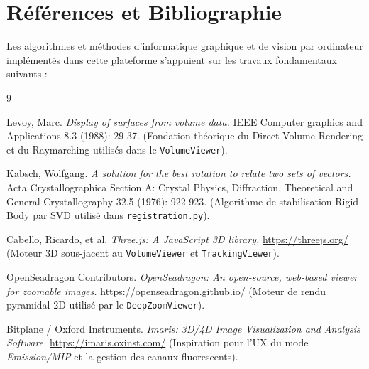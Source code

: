 \chapter{Références et Bibliographie}
\label{chap:references}

Les algorithmes et méthodes d'informatique graphique et de vision par ordinateur implémentés dans cette plateforme s'appuient sur les travaux fondamentaux suivants :

\begin{thebibliography}{9}

Levoy, Marc. 
\textit{Display of surfaces from volume data.}
IEEE Computer graphics and Applications 8.3 (1988): 29-37.
\newblock (Fondation théorique du Direct Volume Rendering et du Raymarching utilisés dans le \texttt{VolumeViewer}).

Kabsch, Wolfgang. 
\textit{A solution for the best rotation to relate two sets of vectors.}
Acta Crystallographica Section A: Crystal Physics, Diffraction, Theoretical and General Crystallography 32.5 (1976): 922-923.
\newblock (Algorithme de stabilisation Rigid-Body par SVD utilisé dans \texttt{registration.py}).

Cabello, Ricardo, et al.
\textit{Three.js: A JavaScript 3D library.}
\newblock \url{https://threejs.org/} (Moteur 3D sous-jacent au \texttt{VolumeViewer} et \texttt{TrackingViewer}).

OpenSeadragon Contributors.
\textit{OpenSeadragon: An open-source, web-based viewer for zoomable images.}
\newblock \url{https://openseadragon.github.io/} (Moteur de rendu pyramidal 2D utilisé par le \texttt{DeepZoomViewer}).

Bitplane / Oxford Instruments.
\textit{Imaris: 3D/4D Image Visualization and Analysis Software.}
\newblock \url{https://imaris.oxinst.com/} (Inspiration pour l'UX du mode \textit{Emission/MIP} et la gestion des canaux fluorescents).

\end{thebibliography}
